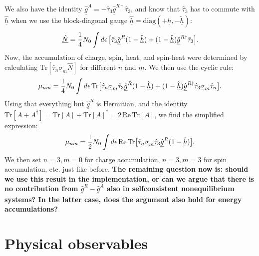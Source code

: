 We also have the identity $\underline{\hat{g}}^A = -\hat{\tau}_3 \underline{\hat{g}}^{R\dagger} \hat{\tau}_3$, and know that $\hat{\tau}_3$ has to commute with $\underline{\hat{h}}$ when we use the block-diagonal gauge $\underline{\hat{h}} = \text{diag}(+\underline{h},-\underline{\tilde{h}})$:
\begin{equation}
  \underline{\hat{N}} = \frac{1}{4} N_0 \int d\epsilon \, \big[ \hat{\tau}_3 \underline{\hat{g}}^R (1-\underline{\hat{h}}) + (1-\underline{\hat{h}}) \underline{\hat{g}}^{R\dagger} \hat{\tau}_3 \big].
\end{equation}
Now, the accumulation of charge, spin, heat, and spin-heat were determined by calculating $\text{Tr}[\hat{\tau}_n \underline{\sigma}_m \underline{\hat{N}}]$ for different $n$ and $m$.
We then use the cyclic rule:
\begin{equation}
  \mu_{nm} = \frac{1}{4} N_0 \int d\epsilon \, \text{Tr}\big[ \hat{\tau}_n \underline{\sigma}_m \hat{\tau}_3 \underline{\hat{g}}^R (1-\underline{\hat{h}}) + (1-\underline{\hat{h}}) \underline{\hat{g}}^{R\dagger} \hat{\tau}_3 \underline{\sigma}_m \hat{\tau}_n\big].
\end{equation}
Using that everything but $\underline{\hat{g}}^R$ is Hermitian, and the identity $\text{Tr}[A+A^\dagger] = \text{Tr}[A] + \text{Tr}[A]^* = 2\,\text{Re}\,\text{Tr}[A]$, we find the simplified expression:
\begin{equation}
  \mu_{nm} = \frac{1}{2} N_0 \int d\epsilon \, \text{Re}\,\text{Tr}\big[ \hat{\tau}_n \underline{\sigma}_m \hat{\tau}_3 \underline{\hat{g}}^R (1-\underline{\hat{h}}) \big].
\end{equation}
We then set $n=3, m=0$ for charge accumulation, $n=3, m=3$ for spin accumulation, etc. just like before.
\textbf{The remaining question now is: should we use this result in the implementation, or can we argue that there is no contribution from $\underline{\hat{g}}^R-\underline{\hat{g}}^A$ also in selfconsistent nonequilibrium systems? In the latter case, does the argument also hold for energy accumulations?}


\chapter{Physical observables}
